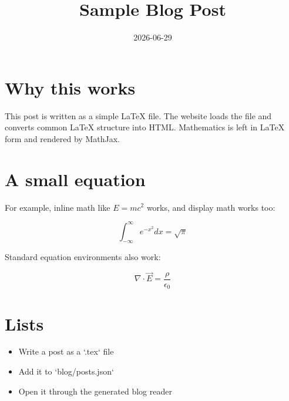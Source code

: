 \documentclass{article}
\title{Sample Blog Post}
\date{2026-06-29}
\begin{document}
\maketitle

\section{Why this works}

This post is written as a simple \LaTeX{} file.
The website loads the file and converts common \LaTeX{} structure into HTML.
Mathematics is left in \LaTeX{} form and rendered by MathJax.

\section{A small equation}

For example, inline math like \(E = mc^2\) works, and display math works too:

\[
    \int_{-\infty}^{\infty} e^{-x^2} dx = \sqrt{\pi}
\]

Standard equation environments also work:

\begin{equation}
    \nabla \cdot \vec{E} = \frac{\rho}{\epsilon_0}
\end{equation}

\section{Lists}

\begin{itemize}
    \item Write a post as a `.tex` file
    \item Add it to `blog/posts.json`
    \item Open it through the generated blog reader
\end{itemize}
\end{document}
